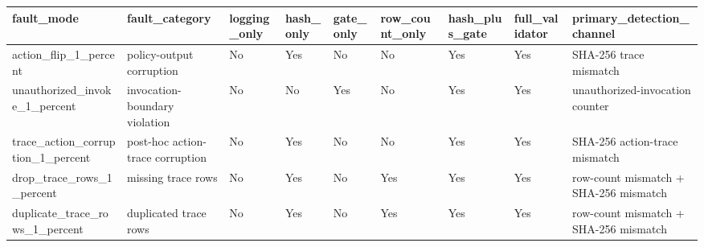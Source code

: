\begin{tabular}{lllllllll}
\toprule
fault\_mode & fault\_category & logging\_only & hash\_only & gate\_only & row\_count\_only & hash\_plus\_gate & full\_validator & primary\_detection\_channel \\
\midrule
action\_flip\_1\_percent & policy-output corruption & No & Yes & No & No & Yes & Yes & SHA-256 trace mismatch \\
unauthorized\_invoke\_1\_percent & invocation-boundary violation & No & No & Yes & No & Yes & Yes & unauthorized-invocation counter \\
trace\_action\_corruption\_1\_percent & post-hoc action-trace corruption & No & Yes & No & No & Yes & Yes & SHA-256 action-trace mismatch \\
drop\_trace\_rows\_1\_percent & missing trace rows & No & Yes & No & Yes & Yes & Yes & row-count mismatch + SHA-256 mismatch \\
duplicate\_trace\_rows\_1\_percent & duplicated trace rows & No & Yes & No & Yes & Yes & Yes & row-count mismatch + SHA-256 mismatch \\
\bottomrule
\end{tabular}
